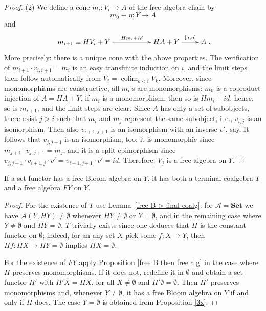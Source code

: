 \documentclass{LMCS}
\theoremstyle{plain}
\theoremstyle{definition}
\numberwithin{equation}{section}
\def\colim{\mathop{\mathrm{colim}}}
\begin{document}
\begin{proof}
\noindent(2) We define a cone $m_i:V_i\rightarrow A$ of the free-algebra chain by
$$m_0\equiv \eta:Y\rightarrow A$$
and
$$\xymatrix{ m_{i+1}\equiv  HV_i+Y\ar[rr]^-{Hm_i+id}&& HA+Y\ar[r]^-{[a,\eta]}& A}.$$
More precisely: there is a unique cone with the above properties. The
verification of $m_{i+1}\cdot v_{i,i+1}=m_i$ is an easy transfinite
induction on $i$, and the limit steps then follow automatically from
$V_i=\colim_{k<i}V_k$. Moreover, since monomorphisms are
constructive, all $m_i$'s are monomorphisms: $m_0$ is a coproduct
injection of $A=HA+Y$, if $m_i$ is a monomorphism, then so is
$Hm_i+id$, hence, so is $m_{i+1}$, and the limit steps are
clear. Since $A$ has only a set of subobjects, 
there exist $j>i$ such
that $m_i$ and $m_j$ represent the same subobject, i.\,e., $v_{i,j}$
is an isomorphism. Then also $v_{i+1,j+1}$ is an isomorphism with an
inverse $v'$, say. It follows that $v_{j,j+1}$ is an isomorphism, too:
it is monomorphic since $m_{j+1}\cdot v_{j,j+1}=m_j$, and it is a
split epimorphism since $v_{j,j+1}\cdot v_{i+1,j} \cdot v' =
v_{i+1,j+1} \cdot v' =id$. Therefore, $V_j$ is a free algebra on $Y$.
\end{proof}

\begin{cor}\label{cor:3.16}
If a set functor has a free Bloom algebra on $Y$, it has both a terminal coalgebra $T$ and a free algebra $FY$ on $Y$.
\end{cor}
\begin{proof}
  For the existence of $T$ use Lemma~\ref{free B-> final coalg}: for $\mathcal A = \mathbf{Set}$ we have $\mathcal A(Y, HY) \neq \emptyset$ whenever $HY \neq \emptyset$ or $Y = \emptyset$, and in the remaining case where $Y \neq\emptyset$ and $HY = \emptyset$, $T$ trivially exists since one deduces that $H$ is the constant functor on $\emptyset$; indeed, for an any set $X$ pick some $f: X \to Y$, then $Hf: HX \to HY = \emptyset$ implies $HX = \emptyset$.

For the existence of $FY$ apply Proposition \ref{free B then free alg} in the case where $H$ preserves monomorphisms. If it does not, redefine it in $\emptyset$ and obtain a set functor $H'$ with $H'X=HX$, for all $X\neq \emptyset$ and $H'\emptyset=\emptyset$. Then $H'$ preserves monomorphisms and, whenever $Y\neq\emptyset$, it has a free Bloom algebra on $Y$ if and only if $H$ does. The case $Y=\emptyset$ is obtained from Proposition \ref{3x}.
\end{proof}
\end{document}

